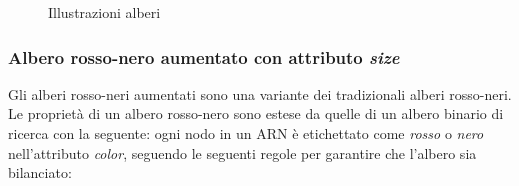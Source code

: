 \documentclass[onecolumn]{article}
\begin{document}
\begin{figure}
	\centering
	\qquad
	\caption{Illustrazioni alberi}
	\label{fig:alberi}
\end{figure}

\subsubsection{Albero rosso-nero aumentato con attributo \textit{size}}

Gli alberi rosso-neri aumentati sono una variante dei tradizionali alberi rosso-neri. Le proprietà di un albero rosso-nero sono estese da quelle di un albero binario di ricerca con la seguente: ogni nodo in un ARN è etichettato come \textit{rosso} o \textit{nero} nell'attributo \textit{color}, seguendo le seguenti regole per garantire che l'albero sia bilanciato:
\end{document}
